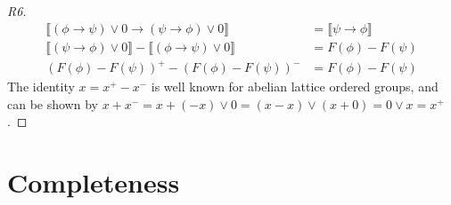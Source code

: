 \documentclass[journal,draftcls,onecolumn]{IEEEtran}
\theoremstyle{definition}
\newcommand{\interp}[1]{\llbracket #1 \rrbracket}
\begin{document}
\begin{proof}[R6]
\begin{align*}
  \interp{(\phi \rightarrow \psi)\lor 0 \rightarrow (\psi \rightarrow \phi) \lor 0} &= \interp{\psi \rightarrow \phi}\\
  \interp{(\psi \rightarrow \phi) \lor 0} - \interp{(\phi \rightarrow \psi)\lor 0} &= F(\phi) - F(\psi)\\
  (F(\phi) - F(\psi))^+ - (F(\phi) - F(\psi))^- & =F(\phi) - F(\psi)
\end{align*}
The identity $x = x^+ - x^-$ is well known for abelian lattice ordered
groups, and can be shown by $x + x^- = x + (-x)\lor 0 = (x - x)\lor(x
+ 0) = 0\lor x = x^+$.
\end{proof}

\section{Completeness}
\end{document}

